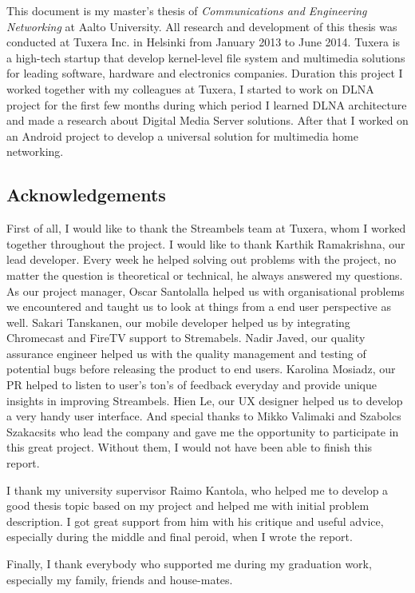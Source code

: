 
This document is my master's thesis of \textit{Communications and Engineering
Networking} at Aalto University. All research and development of this thesis was
conducted at Tuxera Inc. in Helsinki from January 2013 to June 2014. Tuxera is a
high-tech startup that develop kernel-level file system and multimedia solutions
for leading software, hardware and electronics companies.
Duration this project I worked together with my colleagues at Tuxera, I started
to work on DLNA project for the first few months during which period I learned
DLNA architecture and made a research about Digital Media Server solutions.
After that I worked on an Android project to develop a universal solution for
multimedia home networking.

\subsection*{Acknowledgements}
First of all, I would like to thank the Streambels team at Tuxera, whom I worked
together throughout the project. I would like to thank Karthik Ramakrishna, our
lead developer. Every week he helped solving out problems with the project,
no matter the question is theoretical or technical, he always answered my
questions. As our project manager, Oscar Santolalla helped us with
organisational problems we encountered and taught us to look at things from a
end user perspective as well. Sakari Tanskanen, our mobile developer helped us
by integrating Chromecast and FireTV support to Stremabels. Nadir Javed, our
quality assurance engineer helped us with the quality management and testing of
potential bugs before releasing the product to end users. Karolina Mosiadz, our
PR helped to listen to user's ton's of feedback everyday and provide unique
insights in improving Streambels. Hien Le, our UX designer helped us to develop
a very handy user interface. And special thanks to Mikko Valimaki and Szabolcs
Szakacsits who lead the company and gave me the opportunity to participate in
this great project. Without them, I would not have been able to finish this
report.

I thank my university supervisor Raimo Kantola, who helped me to develop a good
thesis topic based on my project and helped me with initial problem description.
I got great support from him with his critique and useful advice, especially
during the middle and final peroid, when I wrote the report.

Finally, I thank everybody who supported me during my graduation work,
especially my family, friends and house-mates.
